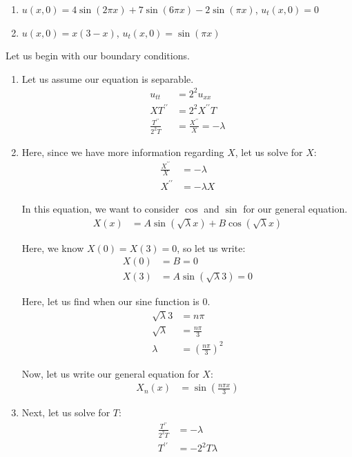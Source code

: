 \documentclass{article}
\begin{document}
\begin{enumerate}
  \begin{enumerate}
    \item $u(x, 0) = 4 \sin(2 \pi x) + 7 \sin(6 \pi x) - 2\sin(\pi x)$, $u_t(x, 0) = 0$
    \item $u(x, 0) = x(3 - x)$, $u_t(x, 0) = \sin(\pi x)$
  \end{enumerate}

  Let us begin with our boundary conditions.
  \begin{enumerate}
    \item Let us assume our equation is separable.
    \begin{align}
      u_{tt} & = 2^2 u_{xx}\\
      XT^{\prime\prime} & = 2^2 X^{\prime\prime}T\\
      \frac{T^{\prime\prime}}{2^2 T} & = \frac{X^{\prime\prime}}{X} = - \lambda
    \end{align}

    \item Here, since we have more information regarding $X$, let us solve for $X$:
    \begin{align}
      \frac{X^{\prime\prime}}{X} & = - \lambda\\
      X^{\prime\prime} & = - \lambda X
    \end{align}

    In this equation, we want to consider $\cos$ and $\sin$ for our general equation.
    \begin{align}
      X(x) & = A \sin(\sqrt \lambda x) + B \cos (\sqrt \lambda x)
    \end{align}

    Here, we know $X(0) = X(3) = 0$, so let us write:
    \begin{align}
      X(0) & = B = 0\\
      X(3) & = A \sin(\sqrt \lambda 3) = 0
    \end{align}

     Here, let us find when our sine function is $0$.
     \begin{align}
       \sqrt \lambda 3 & = n \pi\\
       \sqrt \lambda & = \frac{n \pi}{3}\\
       \lambda & = \left( \frac{n \pi}{3} \right)^2
     \end{align}

     Now, let us write our general equation for $X$:
     \begin{align}
       X_n(x) & = \sin \left( \frac{n \pi x}{3} \right)
     \end{align}
     \item Next, let us solve for $T$:
     \begin{align}
       \frac{T^{\prime\prime}}{2^2T} & = -\lambda\\
       T^{\prime\prime} & = - 2^2 T \lambda
     \end{align}


\end{enumerate}
\end{enumerate}
\end{document}

